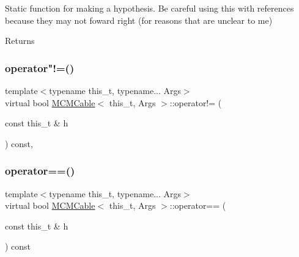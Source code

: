 Static function for making a hypothesis. Be careful using this with references because they may not foward right (for reasons that are unclear to me) 

\begin{DoxyReturn}{Returns}

\end{DoxyReturn}
\mbox{\label{class_m_c_m_cable_a73f816785855f80f5d102528aa671f4b}} 
\subsubsection{\texorpdfstring{operator"!=()}{operator!=()}}
{\footnotesize\ttfamily template$<$typename this\+\_\+t, typename... Args$>$ \\
virtual bool \hyperlink{class_m_c_m_cable}{M\+C\+M\+Cable}$<$ this\+\_\+t, Args $>$\+::operator!= (\begin{DoxyParamCaption}\item[{const this\+\_\+t \&}]{h }\end{DoxyParamCaption}) const\hspace{0.3cm}{\ttfamily [inline]}, {\ttfamily [virtual]}}

\mbox{\label{class_m_c_m_cable_a7b35c04d3d1326b930cfc69dfe0bd207}} 
\subsubsection{\texorpdfstring{operator==()}{operator==()}}
{\footnotesize\ttfamily template$<$typename this\+\_\+t, typename... Args$>$ \\
virtual bool \hyperlink{class_m_c_m_cable}{M\+C\+M\+Cable}$<$ this\+\_\+t, Args $>$\+::operator== (\begin{DoxyParamCaption}\item[{const this\+\_\+t \&}]{h }\end{DoxyParamCaption}) const\hspace{0.3cm}{\ttfamily [pure virtual]}}



